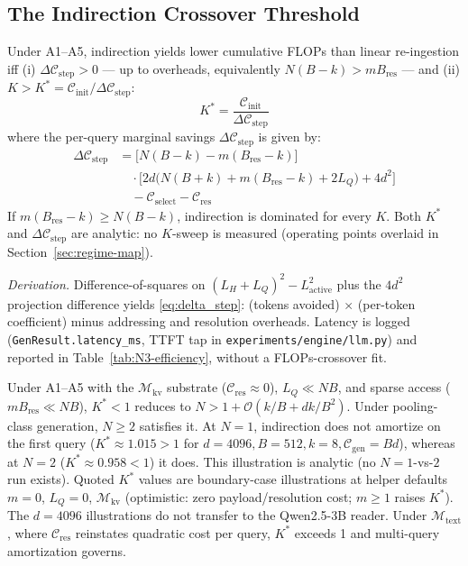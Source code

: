 \documentclass[runningheads]{llncs}
\begin{document}
{\enlargethispage{2\baselineskip}
\subsection{The Indirection Crossover Threshold}

\begin{proposition}\label{prop:crossover}
Under A1--A5, indirection
yields lower cumulative FLOPs than linear re-ingestion iff
(i) $\Delta\mathcal{C}_{\mathrm{step}} > 0$ --- up to overheads, equivalently
 $N(B-k) > mB_{\text{res}}$ --- and (ii) $K > K^\ast =
\mathcal{C}_{\mathrm{init}}/\Delta\mathcal{C}_{\mathrm{step}}$:
\begin{equation}
K^* = \frac{\mathcal{C}_{\mathrm{init}}}{\Delta\mathcal{C}_{\mathrm{step}}}
\end{equation}
where the per-query marginal savings $\Delta\mathcal{C}_{\mathrm{step}}$ is given by:
\begin{align}\label{eq:delta_step}
\Delta\mathcal{C}_{\mathrm{step}} &= \big[N(B-k) - m(B_{\mathrm{res}}{-}k)\big] \nonumber \\
&\quad \cdot \Big[2d\big(N(B{+}k) + m(B_{\mathrm{res}}{-}k) + 2L_Q\big) + 4d^2\Big] \nonumber \\
&\quad - \mathcal{C}_{\mathrm{select}} - \mathcal{C}_{\mathrm{res}}
\end{align}
If $m(B_{\mathrm{res}}{-}k) \geq N(B-k)$,
indirection is dominated for every $K$. Both $K^\ast$ and $\Delta\mathcal{C}_{\mathrm{step}}$ are analytic: no $K$-sweep is measured (operating points overlaid in Section~\ref{sec:regime-map}).
\end{proposition}

\textit{Derivation.} Difference-of-squares on $(L_H{+}L_Q)^2 - L_{\mathrm{active}}^2$ plus the $4d^2$ projection difference yields \eqref{eq:delta_step}: (tokens avoided) $\times$ (per-token coefficient) minus addressing and resolution overheads. Latency is logged (\texttt{GenResult.latency\_ms}, TTFT tap in \texttt{experiments/engine/llm.py}) and reported in Table~\ref{tab:N3-efficiency}, without a FLOPs-crossover fit.

\begin{proposition}\label{prop:single_query}
Under A1--A5 with the $\mathcal{M}_{\text{kv}}$ substrate ($\mathcal{C}_{\mathrm{res}}\approx 0$), $L_Q \ll NB$, and sparse access ($mB_{\text{res}} \ll NB$), $K^* < 1$ reduces to $N > 1 + \mathcal{O}(k/B + dk/B^2)$. Under pooling-class generation, $N \ge 2$ satisfies it. At $N=1$, indirection does not amortize on the first query ($K^* \approx 1.015 > 1$ for $d=4096, B=512, k=8, \mathcal{C}_{\mathrm{gen}}=Bd$), whereas at $N=2$ ($K^* \approx 0.958 < 1$) it does. This illustration is analytic (no $N{=}1$-vs-$2$ run exists). Quoted $K^*$ values are boundary-case illustrations at helper defaults $m{=}0$, $L_Q{=}0$, $\mathcal{M}_{\mathrm{kv}}$ (optimistic: zero payload/resolution cost; $m{\ge}1$ raises $K^*$). The $d{=}4096$ illustrations do not transfer to the Qwen2.5-3B reader. Under $\mathcal{M}_{\text{text}}$, where $\mathcal{C}_{\mathrm{res}}$ reinstates quadratic cost per query, $K^*$ exceeds 1 and multi-query amortization governs.
\end{proposition}

}
\end{document}

